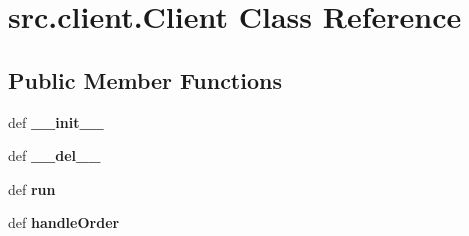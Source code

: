 \hypertarget{classsrc_1_1client_1_1_client}{\section{src.\-client.\-Client \-Class \-Reference}
\label{classsrc_1_1client_1_1_client}
}
\subsection*{\-Public \-Member \-Functions}
\begin{DoxyCompactItemize}
\item 
\hypertarget{classsrc_1_1client_1_1_client_a63e0fbe31d7c47f64ef4e12628f0006f}{def {\bfseries \-\_\-\-\_\-init\-\_\-\-\_\-}}\label{classsrc_1_1client_1_1_client_a63e0fbe31d7c47f64ef4e12628f0006f}

\item 
\hypertarget{classsrc_1_1client_1_1_client_aece67fa18be912de2d7e04840f63d161}{def {\bfseries \-\_\-\-\_\-del\-\_\-\-\_\-}}\label{classsrc_1_1client_1_1_client_aece67fa18be912de2d7e04840f63d161}

\item 
\hypertarget{classsrc_1_1client_1_1_client_a354370a9ad5054293c75e74e79c22280}{def {\bfseries run}}\label{classsrc_1_1client_1_1_client_a354370a9ad5054293c75e74e79c22280}

\item 
\hypertarget{classsrc_1_1client_1_1_client_af341ac55e0b5212451476ea2f69b45e7}{def {\bfseries handle\-Order}}\label{classsrc_1_1client_1_1_client_af341ac55e0b5212451476ea2f69b45e7}

\end{DoxyCompactItemize}
